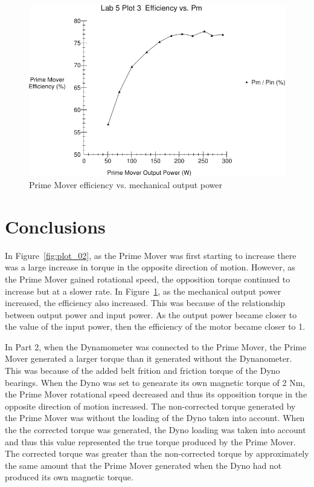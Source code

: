 \documentclass{article}
\begin{document}
\begin{figure}[H]
  \centering
  \includegraphics[width=\textwidth]{img/plot3}
  \caption{Prime Mover efficiency vs. mechanical output power}
  \label{fig:plot_03}
\end{figure}

\section{Conclusions}
In Figure~\ref{fig:plot_02}, as the Prime Mover was first starting to increase there was a large increase
in torque in the opposite direction of motion. However, as the Prime Mover gained rotational speed, the 
opposition torque continued to increase but at a slower rate. In Figure~\ref{fig:plot_03}, as the mechanical
output power increased, the efficiency also increased. This was because of the relationship between output
power and input power. As the output power became closer to the value of the input power, then the efficiency 
of the motor became closer to 1. 

In Part 2, when the Dynamometer was connected to the Prime Mover, the Prime Mover generated a larger torque
than it generated without the Dynanometer. This was because of the added belt frition and friction torque of the 
Dyno bearings. When the Dyno was set to genearate its own magnetic torque of 2 Nm, the Prime Mover rotational speed 
decreased and thus its opposition torque in the opposite direction of motion increased. The non-corrected torque 
generated by the Prime Mover was without the loading of the Dyno taken into account. When the the corrected
torque was generated, the Dyno loading was taken into account and thus this value represented the true torque 
produced by the Prime Mover. The corrected torque was greater than the non-corrected torque by approximately the 
same amount that the Prime Mover generated when the Dyno had not produced its own magnetic torque.
\end{document}
